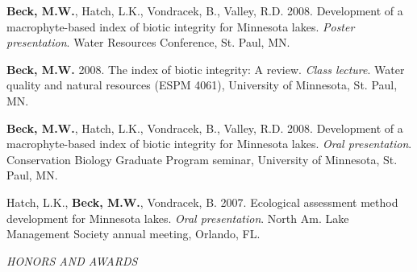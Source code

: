 \documentclass[letterpaper,12pt]{article}
\newcommand{\sectitle}[1]{\vspace{\baselineskip} \centerline{\large{\textit{#1}}}}
\begin{document}
{\bf Beck, M.W.}, Hatch, L.K., Vondracek, B., Valley, R.D. 2008. Development of a macrophyte-based index of biotic integrity for Minnesota lakes. \textit{Poster presentation}. Water Resources Conference, St. Paul, MN.

{\bf Beck, M.W.} 2008. The index of biotic integrity: A review. \textit{Class lecture}. Water quality and natural resources (ESPM 4061), University of Minnesota, St. Paul, MN.

{\bf Beck, M.W.}, Hatch, L.K., Vondracek, B., Valley, R.D. 2008. Development of a macrophyte-based index of biotic integrity for Minnesota lakes. \textit{Oral presentation}. Conservation Biology Graduate Program seminar, University of Minnesota, St. Paul, MN.

Hatch, L.K., {\bf Beck, M.W.}, Vondracek, B. 2007. Ecological assessment method development for Minnesota lakes. \textit{Oral presentation}. North Am. Lake Management Society annual meeting, Orlando, FL.

\sectitle{HONORS AND AWARDS}
\end{document}
